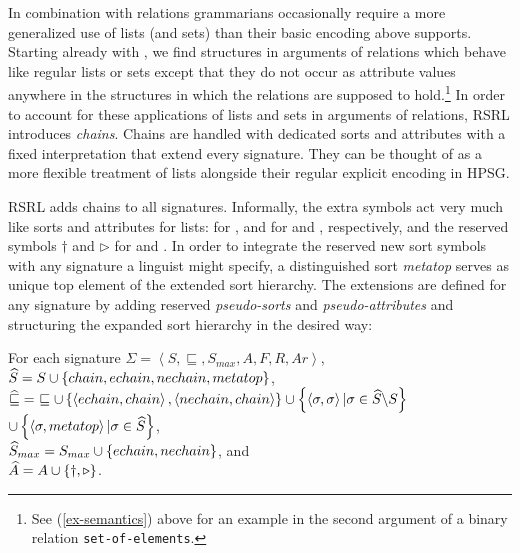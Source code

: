 \documentclass[output=paper
                ,modfonts
                ,nonflat
	        ,collection
	        ,collectionchapter
	        ,collectiontoclongg
 	        ,biblatex
                ,babelshorthands
                ,newtxmath
                ,draftmode
                ,colorlinks, citecolor=brown
]{./langsci/langscibook}
\begin{document}
{{In combination with relations grammarians occasionally require a more
generalized use of lists (and sets) than their basic encoding above
supports. Starting already with \citet{PollardSag1994}, we find structures in
arguments of relations which behave like regular lists or sets except
that they do not occur as attribute values anywhere in the structures
in which the relations are supposed to hold.\footnote{See
  (\ref{ex-semantics}) above for an example in the second argument of
  a binary relation \texttt{set-of-elements}.}  In order to account
for these applications of lists and sets in arguments of relations, RSRL
introduces \emph{chains}. Chains are handled with dedicated sorts and
attributes with a fixed interpretation that extend every signature.
They can be thought of as a more flexible treatment of lists alongside
their regular explicit encoding in HPSG.

RSRL adds chains to all signatures.
Informally, the extra symbols act very much like sorts and attributes for
lists:  for ,  and  for
 and , respectively, and the reserved symbols
$\dagger$ and $\triangleright$ for  and .
In order to integrate the reserved new sort symbols with any
signature a linguist might specify, a distinguished sort \textit{metatop} serves as unique
top element of the extended sort hierarchy. The extensions are defined for
any signature by adding reserved \emph{pseudo-sorts} and \emph{pseudo-attributes}
and structuring the expanded sort hierarchy in the desired way:

\begin{mydef}\label{def-sig-chains}
For each signature $\Sigma=\left<S,\sqsubseteq,S_{max},A,F,R,Ar\right>$,\\
$\widehat{S}= S \cup \left\{\mit{chain, echain, nechain, metatop}\right\}$,\\
$\Aug\sqsubseteq=\ \sqsubseteq\cup\left\{\left<\mathit{echain},\mathit{chain}\right>,\left<\mathit{nechain},\mathit{chain}\right>\right\}\cup\left\{\left<\sigma,\sigma\right>|\sigma\in\Aug{S}\backslash S\right\}$\\
\hspace*{.65cm}       $\cup\left\{\left<\sigma,\mit{metatop}\right>|\sigma\in\widehat{S}\right\}$,\\
$\widehat{S}_{max}=S_{max}\cup\left\{\mit{echain},\mit{nechain}\right\}$, and\\
$\widehat{A}=A\cup\left\{\dagger,\triangleright\right\}$.
\end{mydef}

}}
\end{document}
